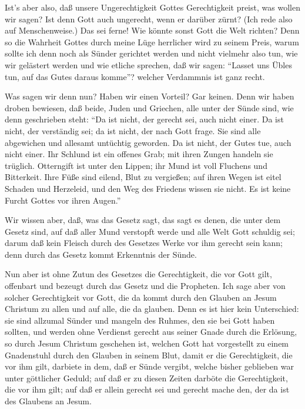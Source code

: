  Ist's aber also, daß unsere Ungerechtigkeit Gottes
Gerechtigkeit preist, was wollen wir sagen? Ist denn Gott auch
ungerecht, wenn er darüber zürnt? (Ich rede also auf Menschenweise.)
 Das sei ferne! Wie könnte sonst Gott die Welt richten?
 Denn so die Wahrheit Gottes durch meine Lüge herrlicher
wird zu seinem Preis, warum sollte ich denn noch als Sünder gerichtet
werden  und nicht vielmehr also tun, wie wir gelästert
werden und wie etliche sprechen, daß wir sagen: ``Lasset uns Übles tun,
auf das Gutes daraus komme''? welcher Verdammnis ist ganz recht.

 Was sagen wir denn nun? Haben wir einen Vorteil? Gar
keinen. Denn wir haben droben bewiesen, daß beide, Juden und Griechen,
alle unter der Sünde sind,  wie denn geschrieben steht:
``Da ist nicht, der gerecht sei, auch nicht einer.  Da ist
nicht, der verständig sei; da ist nicht, der nach Gott frage.
 Sie sind alle abgewichen und allesamt untüchtig geworden.
Da ist nicht, der Gutes tue, auch nicht einer.  Ihr Schlund
ist ein offenes Grab; mit ihren Zungen handeln sie trüglich. Otterngift
ist unter den Lippen;  ihr Mund ist voll Fluchens und
Bitterkeit.  Ihre Füße sind eilend, Blut zu vergießen;
 auf ihren Wegen ist eitel Schaden und Herzeleid,
 und den Weg des Friedens wissen sie nicht. 
Es ist keine Furcht Gottes vor ihren Augen.''

 Wir wissen aber, daß, was das Gesetz sagt, das sagt es
denen, die unter dem Gesetz sind, auf daß aller Mund verstopft werde und
alle Welt Gott schuldig sei;  darum daß kein Fleisch durch
des Gesetzes Werke vor ihm gerecht sein kann; denn durch das Gesetz
kommt Erkenntnis der Sünde.

 Nun aber ist ohne Zutun des Gesetzes die Gerechtigkeit,
die vor Gott gilt, offenbart und bezeugt durch das Gesetz und die
Propheten.  Ich sage aber von solcher Gerechtigkeit vor
Gott, die da kommt durch den Glauben an Jesum Christum zu allen und auf
alle, die da glauben.  Denn es ist hier kein Unterschied:
sie sind allzumal Sünder und mangeln des Ruhmes, den sie bei Gott haben
sollten,  und werden ohne Verdienst gerecht aus seiner
Gnade durch die Erlösung, so durch Jesum Christum geschehen ist,
 welchen Gott hat vorgestellt zu einem Gnadenstuhl durch
den Glauben in seinem Blut, damit er die Gerechtigkeit, die vor ihm
gilt, darbiete in dem, daß er Sünde vergibt, welche bisher geblieben war
unter göttlicher Geduld;  auf daß er zu diesen Zeiten
darböte die Gerechtigkeit, die vor ihm gilt; auf daß er allein gerecht
sei und gerecht mache den, der da ist des Glaubens an Jesum.

